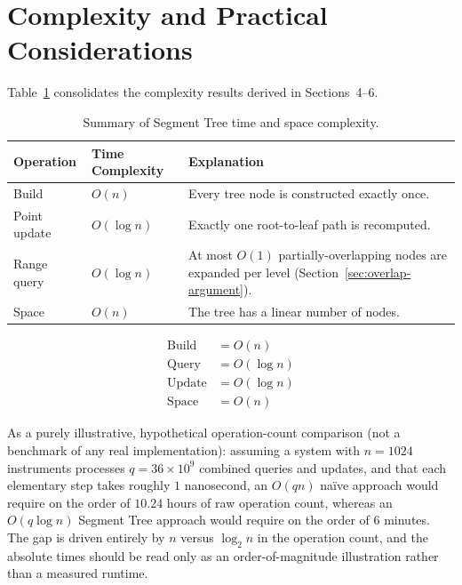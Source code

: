 \documentclass[11pt]{scrartcl}
\begin{document}
\section{Complexity and Practical Considerations}

Table~\ref{tab:summary} consolidates the complexity results derived in Sections~4--6.

\begin{table}[h]
\centering
\caption{Summary of Segment Tree time and space complexity.}
\label{tab:summary}
\begin{tabular}{llp{6.5cm}}
\toprule
\textbf{Operation} & \textbf{Time Complexity} & \textbf{Explanation} \\
\midrule
Build         & $O(n)$      & Every tree node is constructed exactly once. \\
Point update  & $O(\log n)$ & Exactly one root-to-leaf path is recomputed. \\
Range query   & $O(\log n)$ & At most $O(1)$ partially-overlapping nodes are expanded per level (Section~\ref{sec:overlap-argument}). \\
Space         & $O(n)$      & The tree has a linear number of nodes. \\
\bottomrule
\end{tabular}
\end{table}

\begin{equation}
\boxed{
\begin{aligned}
\text{Build} &= O(n) \\
\text{Query} &= O(\log n) \\
\text{Update} &= O(\log n) \\
\text{Space} &= O(n)
\end{aligned}}
\end{equation}

As a purely illustrative, hypothetical operation-count comparison (not a benchmark of any real implementation): assuming a system with $n = 1024$ instruments processes $q = 36 \times 10^9$ combined queries and updates, and that each elementary step takes roughly $1$ nanosecond, an $O(qn)$ na\"ive approach would require on the order of $10.24$ hours of raw operation count, whereas an $O(q \log n)$ Segment Tree approach would require on the order of $6$ minutes. The gap is driven entirely by $n$ versus $\log_2 n$ in the operation count, and the absolute times should be read only as an order-of-magnitude illustration rather than a measured runtime.
\end{document}
